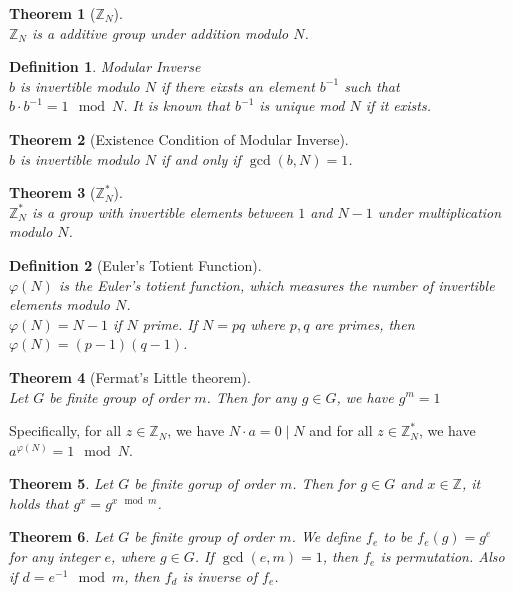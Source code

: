 \documentclass[12pt]{article}
\newtheorem{definition}{Definition}[section]
\newtheorem{theorem}{Theorem}[section]
\theoremstyle{definition}
\begin{document}
\begin{theorem}[{$\mathbb{Z}_{N}$}]
\hfill\\\normalfont $\mathbb{Z}_{N}$ is a additive group under addition modulo $N$.
\end{theorem}
\begin{definition}{Modular Inverse}
\hfill\\\normalfont $b$ is invertible modulo $N$ if there eixsts an element $b^{-1}$ such that $b\cdot b^{-1}=1\mod N$. It is known that $b^{-1}$ is unique mod $N$ if it exists.
\end{definition}
\begin{theorem}[Existence Condition of Modular Inverse]
\hfill\\\normalfont $b$ is invertible modulo $N$ if and only if $\gcd(b,N)=1$.
\end{theorem}
\begin{theorem}[{$\mathbb{Z}^\ast_{N}$}]
\hfill\\\normalfont $\mathbb{Z}_N^\ast$ is a group with invertible elements between $1$ and $N-1$ under multiplication modulo $N$.
\end{theorem}
\begin{definition}[Euler's Totient Function]
\hfill\\\normalfont $\varphi(N)$ is the Euler's totient function, which measures the number of invertible elements modulo $N$.\\
$\varphi(N)=N-1$ if $N$ prime. If $N=pq$ where $p,q$ are primes, then $\varphi(N)=(p-1)(q-1)$.
\end{definition} 
\begin{theorem}[Fermat's Little theorem]
\hfill\\\normalfont Let $G$ be finite group of order $m$. Then for any $g\in G$, we have
$
g^m=1
$
\end{theorem}
Specifically, for all $z\in\mathbb{Z}_N$, we have $N\cdot a=0\mid N$ and for all $z\in \mathbb{Z}_N^\ast$, we have $a^{\varphi(N)}=1\mod N$.
\begin{theorem}\normalfont Let $G$ be finite gorup of order $m$. Then for $g\in G$ and $x\in \mathbb{Z}$, it holds that $g^x=g^{x\mod m}$.
\end{theorem}
\begin{theorem}\normalfont Let $G$ be finite group of order $m$. We define $f_e$ to be $f_e(g)=g^e$ for any integer $e$, where $g\in G$. If $\gcd(e,m)=1$, then $f_e$ is permutation. Also if $d=e^{-1}\mod m$, then $f_d$ is inverse of $f_e$.
\end{theorem}
\end{document}
